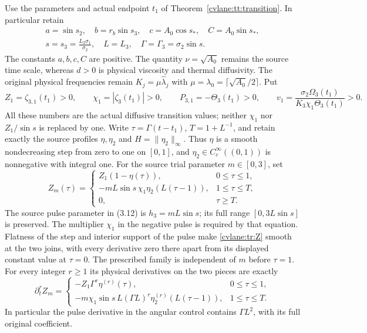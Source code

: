 Use the parameters and actual endpoint $t_1$ of
Theorem~\ref{cvlane:tt:transition}. In particular retain
\[
 \begin{gathered}
 a=\sin s_2,\quad b=r_b\sin s_3,\quad
 c=A_0\cos s_*,\quad C=A_0\sin s_*,\\
 s=s_3=\frac{L_3\sigma_1}{\sigma_2},\quad
 L=L_3,\quad \Gamma=\Gamma_3=\sigma_2\sin s.
 \end{gathered}
\]
The constants $a,b,c,C$ are positive. The quantity
$\nu=\sqrt{A_0}$ remains the source time scale, whereas $d>0$
is physical viscosity and thermal diffusivity. The original physical
frequencies remain $K_j=\mu\widehat\lambda_j$ with
$\mu=\lambda_0=\lceil\sqrt{A_0}/2\rceil$.
Put
\begin{equation}\label{cvlane:tr:entry}
 Z_1=\zeta_{3,1}(t_1)>0,\qquad
 \chi_1=|\zeta_3(t_1)|>0,\qquad
 P_{3,1}=-\Theta_3(t_1)>0,\qquad
 v_1=\frac{\sigma_2\Omega_3(t_1)}{K_3\chi_1\Theta_3(t_1)}>0.
\end{equation}
All these numbers are the actual diffusive transition values; neither
$\chi_1$ nor $Z_1/\sin s$ is replaced by one.
Write $\tau=\Gamma(t-t_1)$, $T=1+L^{-1}$, and retain exactly
the source profiles $\eta,\eta_2$ and $H=\|\eta_2\|_\infty$.
Thus $\eta$ is a smooth nondecreasing step from zero to one on
$[0,1]$, and $\eta_2\in C_c^\infty((0,1))$ is nonnegative
with integral one. For the source trial parameter $m\in[0,3]$, set
\begin{equation}\label{cvlane:tr:Z}
 Z_m(\tau)=
 \begin{cases}
 Z_1(1-\eta(\tau)),&0\leq\tau\leq1,\\
 -mL\sin s\,\chi_1\eta_2(L(\tau-1)),&1\leq\tau\leq T,\\
 0,&\tau\geq T.
 \end{cases}
\end{equation}
The source pulse parameter in (3.12) is $h_3=mL\sin s$;
its full range $[0,3L\sin s]$ is preserved. The multiplier
$\chi_1$ in the negative pulse is required by that equation.
Flatness of the step and interior support of the pulse make
\eqref{cvlane:tr:Z} smooth at the two joins, with every derivative zero
there apart from its displayed constant value at $\tau=0$.
The prescribed family is independent of $m$ before $\tau=1$.
For every integer $r\geq1$ its physical derivatives on the two
pieces are exactly
\begin{equation}\label{cvlane:tr:Z_derivatives}
 \partial_t^r Z_m=
 \begin{cases}
 -Z_1\Gamma^r\eta^{(r)}(\tau),&0\leq\tau\leq1,\\
 -m\chi_1\sin s\,L(\Gamma L)^r
          \eta_2^{(r)}(L(\tau-1)),&1\leq\tau\leq T.
 \end{cases}
\end{equation}
In particular the pulse derivative in the angular control contains
$\Gamma L^2$, with its full original coefficient.

